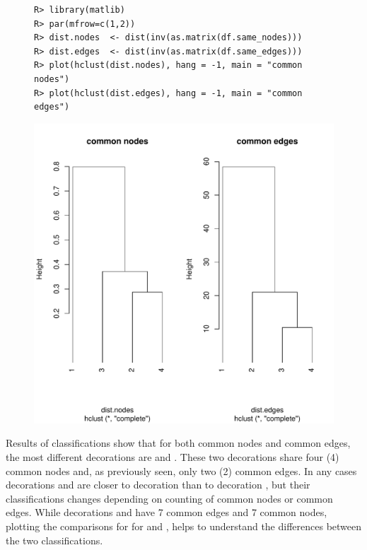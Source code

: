 \documentclass[article]{jss}\usepackage{knitr}
\begin{document}
\begin{figure}[H]
\begin{kframe}
\begin{verbatim}
R> library(matlib)
R> par(mfrow=c(1,2))
R> dist.nodes  <- dist(inv(as.matrix(df.same_nodes)))
R> dist.edges  <- dist(inv(as.matrix(df.same_edges)))
R> plot(hclust(dist.nodes), hang = -1, main = "common nodes")
R> plot(hclust(dist.edges), hang = -1, main = "common edges")
\end{verbatim}
\end{kframe}
\includegraphics[width=\maxwidth]{figure/unnamed-chunk-16-1} 

\end{figure}

Results of classifications show that for both common nodes and common edges, the most different decorations are  and . These two decorations share four (4) common nodes and, as previously seen, only two (2) common edges.
In any cases decorations  and  are closer to decoration  than to decoration , but their classifications changes depending on counting of common nodes or common edges. While decorations  and  have 7 common edges and 7 common nodes, plotting the comparisons for for  and , helps to understand the differences between the two classifications.
\end{document}
